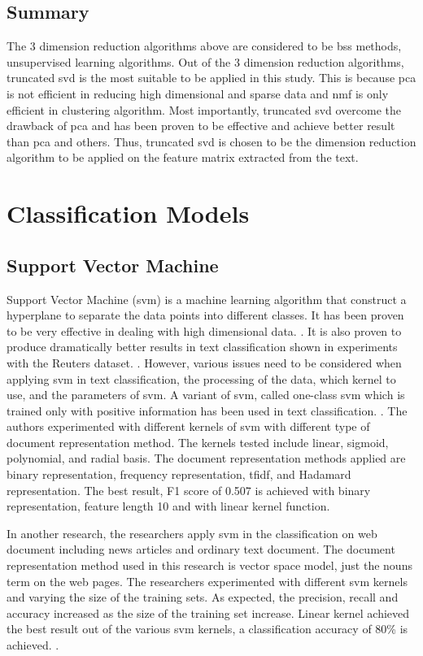 \subsection{Summary}
The 3 dimension reduction algorithms above are considered to be \ac{bss} methods, unsupervised learning algorithms. Out of the 3 dimension reduction algorithms, truncated \ac{svd} is the most suitable to be applied in this study. This is because \ac{pca} is not efficient in reducing high dimensional and sparse data and \ac{nmf} is only efficient in clustering algorithm. Most importantly, truncated \ac{svd} overcome the drawback of \ac{pca} and has been proven to be effective and achieve better result than \ac{pca} and others. Thus, truncated \ac{svd} is chosen to be the dimension reduction algorithm to be applied on the feature matrix extracted from the text.

\section{Classification Models}
\subsection{Support Vector Machine}
Support Vector Machine (\ac{svm}) is a machine learning algorithm that construct a hyperplane to separate the data points into different classes. It has been proven to be very effective in dealing with high dimensional data. \cite{webSvm}. It is also proven to produce dramatically better results in text classification shown in experiments with the Reuters dataset. \cite{inductiveText}. However, various issues need to be considered when applying \ac{svm} in text classification, the processing of the data, which kernel to use, and the parameters of \ac{svm}. A variant of \ac{svm}, called one-class \ac{svm} which is trained only with positive information has been used in text classification. \cite{oneSvm}.  The authors experimented with different kernels of \ac{svm} with different type of document representation method. The kernels tested include linear, sigmoid, polynomial, and radial basis. The document representation methods applied are binary representation, frequency representation, \ac{tfidf}, and Hadamard representation. The best result, F1 score of 0.507 is achieved with binary representation, feature length 10 and with linear kernel function.  

In another research, the researchers apply \ac{svm} in the classification on web document including news articles and ordinary text document. The document representation method used in this research is vector space model, just the nouns term on the web pages. The researchers experimented with different \ac{svm} kernels and varying the size of the training sets. As expected, the precision, recall and accuracy increased as the size of the training set increase. Linear kernel achieved the best result out of the various \ac{svm} kernels, a classification accuracy of 80\% is achieved. \cite{webSvm}.
	
